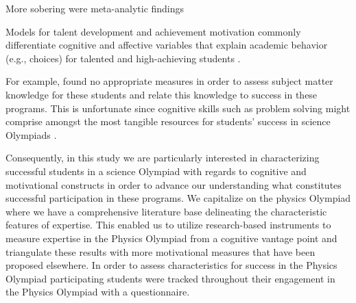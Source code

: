 \documentclass[../main/TaylorFrancis/interactapasample]{subfiles}
\begin{document}
More sobering were meta-analytic findings 

Models for talent development and achievement motivation commonly differentiate cognitive and affective variables that explain academic behavior (e.g., choices) for talented and high-achieving students \citep{Heller.2002,Ziegler.2004}.

For example, \cite{Urhahne.2012} found no appropriate measures in order to assess subject matter knowledge for these students and relate this knowledge to success in these programs. This is unfortunate since cognitive skills such as problem solving might comprise amongst the most tangible resources for students' success in science Olympiads \citep{Bransford.2000,Wai.2009}. 


Consequently, in this study we are particularly interested in characterizing successful students in a science Olympiad with regards to cognitive and motivational constructs in order to advance our understanding what constitutes successful participation in these programs. We capitalize on the physics Olympiad where we have a comprehensive literature base delineating the characteristic features of expertise. This enabled us to utilize research-based instruments to measure expertise in the Physics Olympiad from a cognitive vantage point and triangulate these results with more motivational measures that have been proposed elsewhere. In order to assess characteristics for success in the Physics Olympiad participating students were tracked throughout their engagement in the Physics Olympiad with a questionnaire. 
\end{document}
